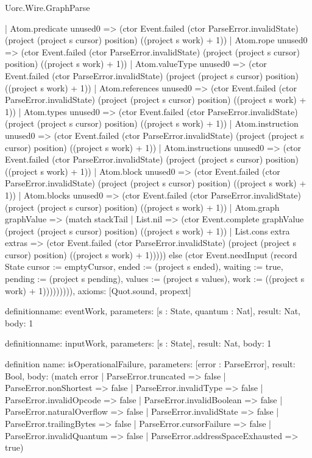 \begin{lexlean}{Uorc.Wire.GraphParse}
\begin{semanticmodule}
{            | Atom.predicate unused0 => (ctor Event.failed (ctor ParseError.invalidState) (project (project s cursor) position) ((project s work) + 1))
            | Atom.rope unused0 => (ctor Event.failed (ctor ParseError.invalidState) (project (project s cursor) position) ((project s work) + 1))
            | Atom.valueType unused0 => (ctor Event.failed (ctor ParseError.invalidState) (project (project s cursor) position) ((project s work) + 1))
            | Atom.references unused0 => (ctor Event.failed (ctor ParseError.invalidState) (project (project s cursor) position) ((project s work) + 1))
            | Atom.types unused0 => (ctor Event.failed (ctor ParseError.invalidState) (project (project s cursor) position) ((project s work) + 1))
            | Atom.instruction unused0 => (ctor Event.failed (ctor ParseError.invalidState) (project (project s cursor) position) ((project s work) + 1))
            | Atom.instructions unused0 => (ctor Event.failed (ctor ParseError.invalidState) (project (project s cursor) position) ((project s work) + 1))
            | Atom.block unused0 => (ctor Event.failed (ctor ParseError.invalidState) (project (project s cursor) position) ((project s work) + 1))
            | Atom.blocks unused0 => (ctor Event.failed (ctor ParseError.invalidState) (project (project s cursor) position) ((project s work) + 1))
            | Atom.graph graphValue => (match stackTail
              | List.nil => (ctor Event.complete graphValue (project (project s cursor) position) ((project s work) + 1))
              | List.cons extra extras => (ctor Event.failed (ctor ParseError.invalidState) (project (project s cursor) position) ((project s work) + 1))))) else (ctor Event.needInput (record State {cursor := emptyCursor, ended := (project s ended), waiting := true, pending := (project s pending), values := (project s values), work := ((project s work) + 1)})))))))),
  axioms: [Quot.sound, propext]
}

definition{name: eventWork, parameters: [s : State, quantum : Nat], result: Nat, body: 1}

definition{name: inputWork, parameters: [s : State], result: Nat, body: 1}

definition{
  name: isOperationalFailure,
  parameters: [error : ParseError],
  result: Bool,
  body: (match error
    | ParseError.truncated => false
    | ParseError.nonShortest => false
    | ParseError.invalidType => false
    | ParseError.invalidOpcode => false
    | ParseError.invalidBoolean => false
    | ParseError.naturalOverflow => false
    | ParseError.invalidState => false
    | ParseError.trailingBytes => false
    | ParseError.cursorFailure => false
    | ParseError.invalidQuantum => false
    | ParseError.addressSpaceExhausted => true)
}


\end{semanticmodule}
\end{lexlean}
